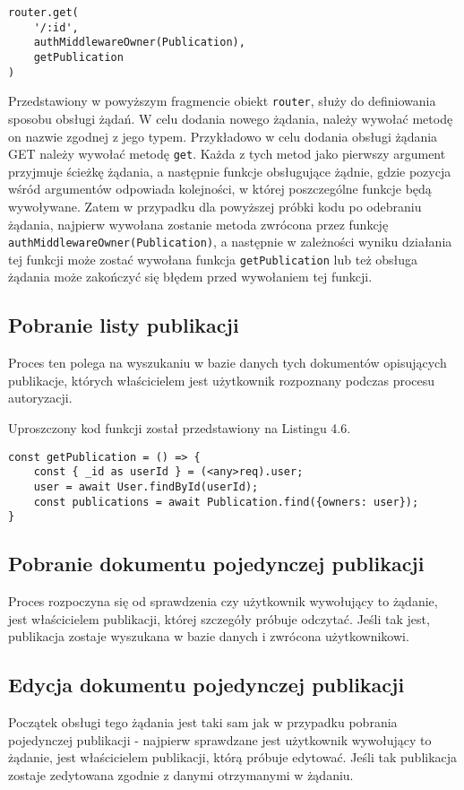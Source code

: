 \documentclass[a4paper,12pt,twoside,openany]{report}
\begin{document}
\begin{lstlisting}[caption=Deklaracja obsługi żądania,label=code1,captionpos=b]
router.get(
	'/:id', 
	authMiddlewareOwner(Publication), 
	getPublication
)
\end{lstlisting}
Przedstawiony w powyższym fragmencie obiekt \verb|router|, służy do definiowania sposobu obsługi żądań. W celu dodania nowego żądania, należy wywołać metodę on nazwie zgodnej z jego typem. Przykładowo w celu dodania obsługi żądania GET należy wywołać metodę \verb|get|. Każda z tych metod jako pierwszy argument przyjmuje ścieżkę żądania, a następnie funkcje obsługujące żądnie, gdzie pozycja wśród argumentów odpowiada kolejności, w której poszczególne funkcje będą wywoływane. Zatem w przypadku dla powyższej próbki kodu po odebraniu żądania, najpierw wywołana zostanie metoda zwrócona przez funkcję \verb|authMiddlewareOwner(Publication)|, a następnie w zależności wyniku działania tej funkcji może zostać wywołana funkcja \verb|getPublication| lub też obsługa żądania może zakończyć się błędem przed wywołaniem tej funkcji.


\subsection{Pobranie listy publikacji}
Proces ten polega na wyszukaniu w bazie danych tych dokumentów opisujących publikacje, których właścicielem jest użytkownik rozpoznany podczas procesu autoryzacji.
\pagebreak

Uproszczony kod funkcji został przedstawiony na Listingu 4.6.
\begin{lstlisting}[caption=Funkcja getPublication,label=code1,captionpos=b]
const getPublication = () => {
	const { _id as userId } = (<any>req).user;
	user = await User.findById(userId);
	const publications = await Publication.find({owners: user});
}
\end{lstlisting}
\subsection{Pobranie dokumentu pojedynczej publikacji}
Proces rozpoczyna się od sprawdzenia czy użytkownik wywołujący to żądanie, jest właścicielem publikacji, której szczegóły próbuje odczytać. Jeśli tak jest, publikacja zostaje wyszukana w bazie danych i zwrócona użytkownikowi.

\subsection{Edycja dokumentu pojedynczej publikacji}
Początek obsługi tego żądania jest taki sam jak w przypadku pobrania pojedynczej publikacji - najpierw sprawdzane jest użytkownik wywołujący to żądanie, jest właścicielem publikacji, którą próbuje edytować. Jeśli tak publikacja zostaje zedytowana zgodnie z danymi otrzymanymi w żądaniu.
\end{document}
